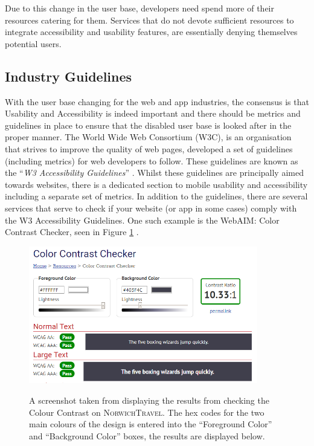 \documentclass[cmpstyle]{ueacmpstyle}
\newcommand{\nt}{\textsc{NorwichTravel}}
\begin{document}
		Due to this change in the user base, developers need spend more of their resources catering for them. Services that do not devote sufficient resources to integrate accessibility and usability features, are essentially denying themselves potential users.
		
		\subsection{Industry Guidelines} \label{sec:industry}
		With the user base changing for the web and app industries, the consensus is that Usability and Accessibility is indeed important and there should be metrics and guidelines in place to ensure that the disabled user base is looked after in the proper manner. The World Wide Web Consortium (W3C), is an organisation that strives to improve the quality of web pages, developed a set of guidelines (including metrics) for web developers to follow. These guidelines are known as the ``\textit{W3 Accessibility Guidelines}'' \citep{w3guide}. Whilst these guidelines are principally aimed towards websites, there is a dedicated section to mobile usability and accessibility including a separate set of metrics. In addition to the guidelines, there are several services that serve to check if your website (or app in some cases) comply with the W3 Accessibility Guidelines. One such example is the WebAIM: Color Contrast Checker, seen in Figure \ref{fig:contrast-check} \citep{contrast-check}.
		
		\begin{figure}
			\centering
			\includegraphics[height=6cm]{images/contrast-checker.png}\\
			\caption{A screenshot taken from \citep{contrast-check} displaying the results from checking the Colour Contrast on \nt. The hex codes for the two main colours of the design is entered into the ``Foreground Color'' and ``Background Color'' boxes, the results are displayed below.}\label{fig:contrast-check}
		\end{figure}
		
\end{document}
